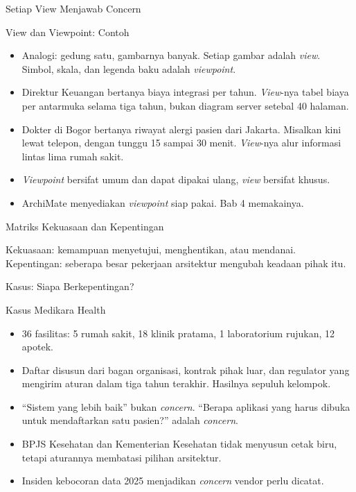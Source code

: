 \documentclass[aspectratio=169, table, 12pt]{beamer}
\begin{document}
\begin{frame}{{\Large Setiap View Menjawab Concern}}
  \centering
\end{frame}

\begin{frame}{{\Large View dan Viewpoint: Contoh}}
  \vspace{6pt}
  \small
  \begin{itemize}
    \item Analogi: gedung satu, gambarnya banyak. Setiap gambar adalah \textit{view}. Simbol, skala, dan
          legenda baku adalah \textit{viewpoint}.
    \item Direktur Keuangan bertanya biaya integrasi per tahun. \textit{View}-nya tabel biaya per
          antarmuka selama tiga tahun, bukan diagram server setebal 40 halaman.
    \item Dokter di Bogor bertanya riwayat alergi pasien dari Jakarta. Misalkan kini lewat telepon,
          dengan tunggu 15 sampai 30 menit. \textit{View}-nya alur informasi lintas lima rumah sakit.
    \item \textit{Viewpoint} bersifat umum dan dapat dipakai ulang, \textit{view} bersifat khusus.
    \item ArchiMate menyediakan \textit{viewpoint} siap pakai. Bab 4 memakainya.
  \end{itemize}
\end{frame}

\begin{frame}{{\Large Matriks Kekuasaan dan Kepentingan}}
  \centering
  {\small Kekuasaan: kemampuan menyetujui, menghentikan, atau mendanai. Kepentingan: seberapa besar
  pekerjaan arsitektur mengubah keadaan pihak itu.\par}
  \vspace{4pt}
\end{frame}

\begin{frame}{{\Large Kasus: Siapa Berkepentingan?}}
  \begin{block}{Kasus Medikara Health}
    \small
    \begin{itemize}
      \item 36 fasilitas: 5 rumah sakit, 18 klinik pratama, 1 laboratorium rujukan, 12 apotek.
      \item Daftar disusun dari bagan organisasi, kontrak pihak luar, dan regulator yang mengirim aturan
            dalam tiga tahun terakhir. Hasilnya sepuluh kelompok.
      \item ``Sistem yang lebih baik'' bukan \textit{concern}. ``Berapa aplikasi yang harus dibuka untuk
            mendaftarkan satu pasien?'' adalah \textit{concern}.
      \item BPJS Kesehatan dan Kementerian Kesehatan tidak menyusun cetak biru, tetapi aturannya membatasi
            pilihan arsitektur.
      \item Insiden kebocoran data 2025 menjadikan \textit{concern} vendor perlu dicatat.
    \end{itemize}
  \end{block}
\end{frame}
\end{document}
